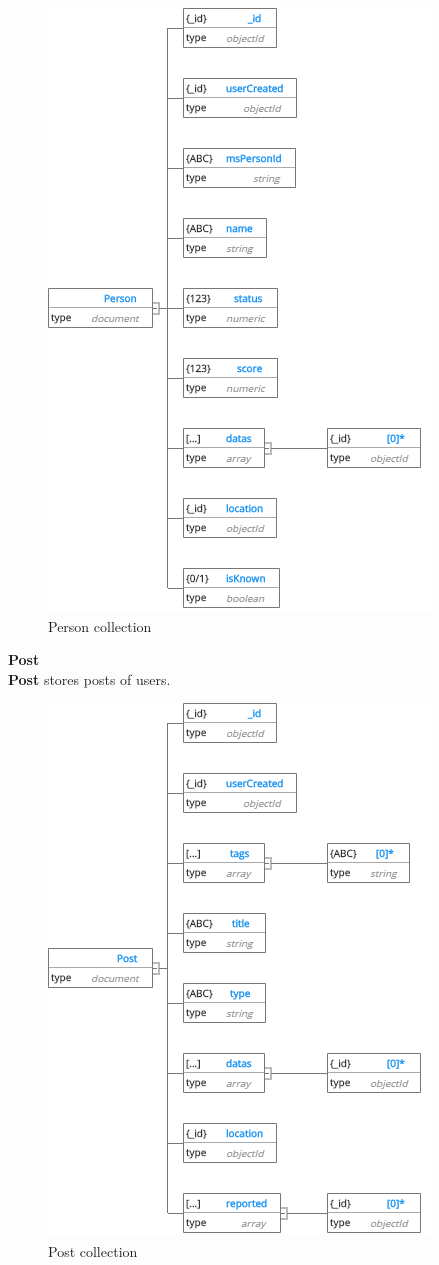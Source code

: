 \begin{center}
	\begin{figure}[H]
		\centering
		\includegraphics[width=0.7\columnwidth]{images/chap4/Person.png}
		\caption{Person collection}
	\end{figure}
\end{center}
\cleardoublepage
\textbf{Post}\\
\textbf{Post} stores posts of users.
\begin{center}
	\begin{figure}[H]
		\centering
		\includegraphics[width=0.7\columnwidth]{images/chap4/Post.png}
		\caption{Post collection}
	\end{figure}
\end{center}
